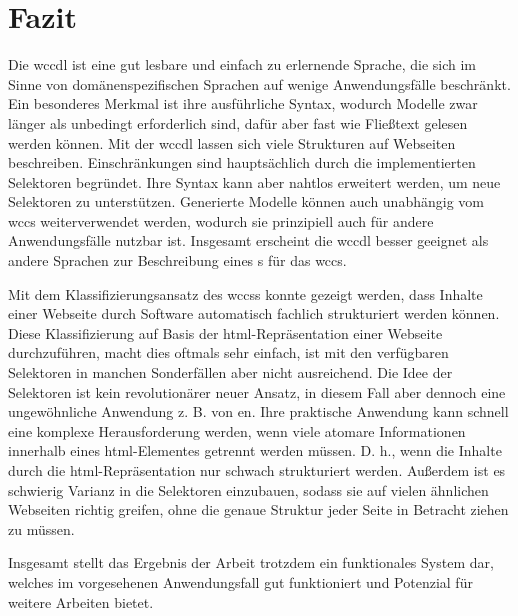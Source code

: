\section{Fazit}
    Die \gls{wccdl} ist eine gut lesbare und einfach zu erlernende Sprache,
    die sich im Sinne von domänenspezifischen Sprachen
    auf wenige Anwendungsfälle beschränkt.
    Ein besonderes Merkmal ist ihre ausführliche Syntax,
    wodurch Modelle zwar länger als unbedingt erforderlich sind,
    dafür aber fast wie Fließtext gelesen werden können.
    Mit der \gls{wccdl} lassen sich viele Strukturen auf Webseiten beschreiben.
    Einschränkungen sind hauptsächlich durch die implementierten Selektoren begründet.
    Ihre Syntax kann aber nahtlos erweitert werden, um neue Selektoren zu unterstützen.
    Generierte Modelle können auch unabhängig vom \gls{wccs} weiterverwendet werden,
    wodurch sie prinzipiell auch für andere Anwendungsfälle nutzbar ist.
    Insgesamt erscheint die \gls{wccdl} besser geeignet als andere Sprachen
    zur Beschreibung eines {\classificationModel}s für das \gls{wccs}.

    Mit dem Klassifizierungsansatz des \glspl{wccs} konnte gezeigt werden,
    dass Inhalte einer Webseite durch Software automatisch fachlich strukturiert werden können.
    Diese Klassifizierung auf Basis der \gls{html}-Repräsentation einer Webseite durchzuführen,
    macht dies oftmals sehr einfach, ist mit den verfügbaren Selektoren
    in manchen Sonderfällen aber nicht ausreichend.
    Die Idee der Selektoren ist kein revolutionärer neuer Ansatz,
    in diesem Fall aber dennoch eine ungewöhnliche Anwendung z. B. von {\cssSelector}en.
    Ihre praktische Anwendung kann schnell eine komplexe Herausforderung werden,
    wenn viele atomare Informationen innerhalb eines \gls{html}-Elementes getrennt werden müssen.
    D. h., wenn die Inhalte durch die \gls{html}-Repräsentation nur schwach strukturiert werden.
    Außerdem ist es schwierig Varianz in die Selektoren einzubauen,
    sodass sie auf vielen ähnlichen Webseiten richtig greifen,
    ohne die genaue Struktur jeder Seite in Betracht ziehen zu müssen.

    Insgesamt stellt das Ergebnis der Arbeit trotzdem ein funktionales System dar,
    welches im vorgesehenen Anwendungsfall gut funktioniert
    und Potenzial für weitere Arbeiten bietet.